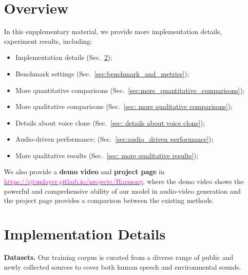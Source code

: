 \section{Overview}
In this supplementary material, we provide more implementation details, experiment results, including:

\begin{itemize}
    \item Implementation details (Sec.~\ref{sec:implementation details});
    \item Benchmark settings (Sec.~\ref{sec:benchmark_and_metrics});
    \item More quantitative comparisons (Sec.~\ref{sec:more_quantitative_comparisons});
    \item More qualitative comparisons (Sec.~\ref{sec: more qualitative comparisons});
    \item Details about voice clone (Sec.~\ref{sec: details about voice clone});
    \item Audio-driven performance; (Sec.~\ref{sec:audio_driven performance});
    \item More qualitative results (Sec.~\ref{sec: more qualitative results});
    
\end{itemize}
We also provide a \textbf{demo video} and \textbf{project page} in \href{https://sjtuplayer.github.io/projects/Harmony}{\textcolor{magenta}{https://sjtuplayer.github.io/projects/Harmony}}, where the demo video shows the powerful and comprehensive ability of our model in audio-video generation and the project page provides a comparison between the existing methods.

\section{Implementation Details}
\label{sec:implementation details}

\noindent\textbf{Datasets.}
Our training corpus is curated from a diverse range of public and newly collected sources to cover both human speech and environmental sounds.

